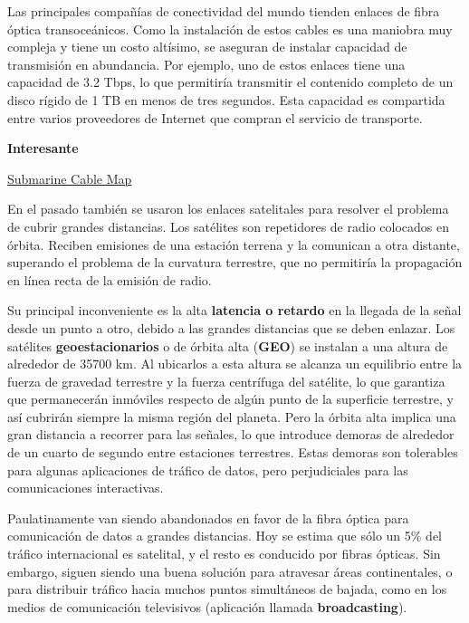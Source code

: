 \documentclass[spanish,a4paper,]{article}
\begin{document}
Las principales compañías de conectividad del mundo tienden enlaces de
fibra óptica transoceánicos. Como la instalación de estos cables es una
maniobra muy compleja y tiene un costo altísimo, se aseguran de instalar
capacidad de transmisión en abundancia. Por ejemplo, uno de estos
enlaces tiene una capacidad de 3.2 Tbps, lo que permitiría transmitir el
contenido completo de un disco rígido de 1 TB en menos de tres segundos.
Esta capacidad es compartida entre varios proveedores de Internet que
compran el servicio de transporte.

\textbf{Interesante}

\href{http://www.submarinecablemap.com/\#/landing-point/las-toninas-argentina}{Submarine
Cable Map}

En el pasado también se usaron los enlaces satelitales para resolver el
problema de cubrir grandes distancias. Los satélites son repetidores de
radio colocados en órbita. Reciben emisiones de una estación terrena y
la comunican a otra distante, superando el problema de la curvatura
terrestre, que no permitiría la propagación en línea recta de la emisión
de radio.

Su principal inconveniente es la alta \textbf{latencia o retardo} en la
llegada de la señal desde un punto a otro, debido a las grandes
distancias que se deben enlazar. Los satélites \textbf{geoestacionarios}
o de órbita alta (\textbf{GEO}) se instalan a una altura de alrededor de
35700 km. Al ubicarlos a esta altura se alcanza un equilibrio entre la
fuerza de gravedad terrestre y la fuerza centrífuga del satélite, lo que
garantiza que permanecerán inmóviles respecto de algún punto de la
superficie terrestre, y así cubrirán siempre la misma región del
planeta. Pero la órbita alta implica una gran distancia a recorrer para
las señales, lo que introduce demoras de alrededor de un cuarto de
segundo entre estaciones terrestres. Estas demoras son tolerables para
algunas aplicaciones de tráfico de datos, pero perjudiciales para las
comunicaciones interactivas.

Paulatinamente van siendo abandonados en favor de la fibra óptica para
comunicación de datos a grandes distancias. Hoy se estima que sólo un
5\% del tráfico internacional es satelital, y el resto es conducido por
fibras ópticas. Sin embargo, siguen siendo una buena solución para
atravesar áreas continentales, o para distribuir tráfico hacia muchos
puntos simultáneos de bajada, como en los medios de comunicación
televisivos (aplicación llamada \textbf{broadcasting}).
\end{document}
